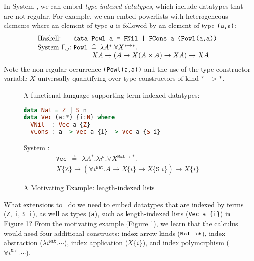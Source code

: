 In System \Fw, we can embed \emph{type-indexed datatypes}, which include
datatypes that are not regular. For example, we can embed powerlists with
heterogeneous elements where an element of type \texttt{a} is followed by
an element of type \texttt{(a,a)}:
\[
\begin{array}{ll}
\text{Haskell:} & \!\!\!\!\texttt{data Powl a = PNil | PCons a (Powl(a,a))} \\
\text{System \Fw:} & \!\!\!\!\texttt{{Powl}}\:\triangleq\:
\lambda A^{*}.\forall X^{*\to*}.\\ \qquad
& \qquad X A\to (A\to X(A\times A)\to X A)\to XA
\end{array}
\]
Note the non-regular occurrence \texttt{(Powl(a,a))} and
the use of the type constructor variable $X$ universally quantifying over
type constructors of kind $* -> *$.

\begin{figure}\noindent
{}
\!\!\!\!\!A functional language supporting term-indexed datatypes: \vspace*{-4.5pt}
\begin{lstlisting}[basicstyle={\ttfamily},language=Haskell]
data Nat = Z | S n
data Vec (a:*) {i:N} where
  VNil  : Vec a {Z}
  VCons : a -> Vec a {i} -> Vec a {S i}
\end{lstlisting}\noindent
\!\!\!System \Fi: \vspace*{-7pt}
\begin{multline*}\!\!\!\!\!\!\!
\texttt{{Vec}}\:\:\triangleq\:\:\lambda A^{*}.\lambda i^{\texttt{{N}}}.
\forall X^{\texttt{{Nat}}\to*}.\\
X\{\texttt{{Z}}\}\to
(\forall i^{\texttt{{Nat}}}.A\to X\{i\}\to X\{\texttt{{S}}\; i\})\to X\{i\}
\end{multline*}\vspace*{-10pt}
\caption{A Motivating Example: length-indexed lists}
\label{fig:motiv}
\end{figure}

What extensions to \Fw\ do we need to embed datatypes that are indexed by
terms (\texttt{Z}, \texttt{i}, \texttt{S i}), as well as types (\texttt{a}),
such as length-indexed lists (\verb|Vec a {i}|) in Figure \ref{fig:motiv}?
From the motivating example (Figure \ref{fig:motiv}), we learn that
the calculus would need four additional constructs:
index arrow kinds ($\texttt{{Nat}\ensuremath{\to}*}$),
index abstraction ($\lambda i^{\texttt{{Nat}}}.\cdots$),
index application ($X\{i\}$), and
index polymorphism ($\forall i^{\texttt{{Nat}}}.\cdots$).



